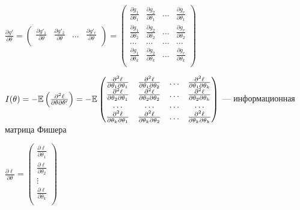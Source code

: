 $\frac{\partial g'}{\partial \theta} = \begin{pmatrix}
\frac{\partial g'_1}{\partial \theta} & \frac{\partial g'_2}{\partial \theta} & \ldots & \frac{\partial g'_r}{\partial \theta} \\
\end{pmatrix} = \begin{pmatrix}
\frac{\partial g_1}{\partial \theta_1} & \frac{\partial g_2}{\partial \theta_1} & \ldots & \frac{\partial g_r}{\partial \theta_1}\\
\frac{\partial g_1}{\partial \theta_2} & \frac{\partial g_2}{\partial \theta_2} & \ldots & \frac{\partial g_r}{\partial \theta_2}\\
\ldots & \ldots & \ldots & \ldots \\
\frac{\partial g_1}{\partial \theta_k} & \frac{\partial g_2}{\partial \theta_k} & \ldots & \frac{\partial g_r}{\partial \theta_k}\\
\end{pmatrix}$

$I(\theta) = -\mathbb{E} \left(\frac{\partial^2 \ell}{\partial \theta \partial \theta'}\right) = - \mathbb{E} \begin{pmatrix}
\frac{\partial^2 \ell}{\partial \theta_1 \partial \theta_1} & \frac{\partial^2 \ell}{\partial \theta_1 \partial \theta_2} & \ldots & \frac{\partial^2 \ell}{\partial \theta_1 \partial \theta_k} \\
\frac{\partial^2 \ell}{\partial \theta_2 \partial \theta_1} & \frac{\partial^2 \ell}{\partial \theta_2 \partial \theta_2} & \ldots & \frac{\partial^2 \ell}{\partial \theta_2 \partial \theta_k} \\
\ldots & \ldots & \ldots & \ldots \\
\frac{\partial^2 \ell}{\partial \theta_k \partial \theta_1} & \frac{\partial^2 \ell}{\partial \theta_k \partial \theta_2} & \ldots & \frac{\partial^2 \ell}{\partial \theta_k \partial \theta_k} \\
\end{pmatrix}$ — информационная матрица Фишера

$\frac{\partial \ell}{\partial \theta} = \begin{pmatrix}
\frac{\partial \ell}{\partial \theta_1} \\
\frac{\partial \ell}{\partial \theta_2} \\
\vdots \\
\frac{\partial \ell}{\partial \theta_k} \\
\end{pmatrix}$

